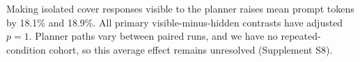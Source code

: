 Making isolated cover responses visible to the planner raises mean prompt tokens by 18.1\% and 18.9\%. All primary visible-minus-hidden contrasts have adjusted $p=1$. Planner paths vary between paired runs, and we have no repeated-condition cohort, so this average effect remains unresolved (Supplement S8).
